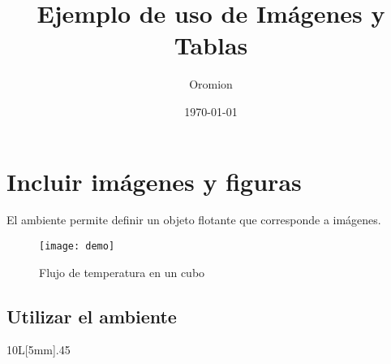 \documentclass{article}
\title{Ejemplo de uso de Imágenes y Tablas}
\author{Oromion}
\date{\today}
\begin{document}
\maketitle
\renewcommand{\contentsname}{Tabla de contenido}
\renewcommand{\listfigurename}{Lista de figuras}
\renewcommand{\figurename}{Fig.}
\tableofcontents
\listoffigures
\section{Incluir imágenes y figuras}

El ambiente %
 permite definir un objeto flotante que corresponde a imágenes.

\begin{figure}[H]
\centering
\texttt{[image: demo]}
\caption{Flujo de temperatura en un cubo}
\end{figure}

\subsection{Utilizar el ambiente }%

\begin{wrapfigure}{10}{L}[5mm]{.45\textwidth}
	\centering
	
\end{wrapfigure}
\end{document}
